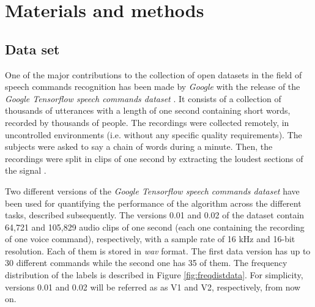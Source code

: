
 \section{Materials and methods} \label{sec:MM}

\subsection{Data set}
One of the major contributions to the collection of open datasets in the field of speech commands recognition has been made by \textit{Google} with the release of the \textit{Google Tensorflow speech commands dataset} \autocite{speechcommands, Warden2018}. It consists of a collection of thousands of utterances with a length of one second containing short words, recorded by thousands of people. The recordings were collected remotely, in uncontrolled environments (i.e. without any specific quality requirements). The subjects were asked to say a chain of words during a minute. Then, the recordings were split in clips of one second by extracting the loudest sections of the signal \autocite{speechcommands, Warden2018}.

Two different versions of the \textit{Google Tensorflow speech commands dataset} have been used for quantifying the performance of the algorithm across the different tasks, described subsequently. The versions 0.01 and 0.02 of the dataset contain 64,721 and 105,829 audio clips of one second (each one containing the recording of one voice command), respectively, with a sample rate of 16 kHz and 16-bit resolution. Each of them is stored in \textit{wav} format. The first data version has up to 30 different commands while the second one has 35 of them. The frequency distribution of the labels is described in Figure \ref{fig:freqdistdata}. For simplicity, versions 0.01 and 0.02 will be referred as as V1 and V2, respectively, from now on.


